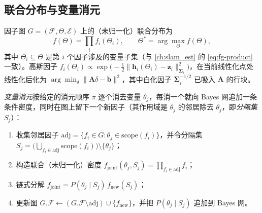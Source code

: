\subsection{联合分布与变量消元}
\label{sec:isam-elimination}

因子图 $G=(\mathcal{F},\Theta,\mathcal{E})$ 上的（未归一化）联合分布为\cite{kaess2012isam2}
\begin{equation}
  f(\Theta)=\prod_i f_i(\Theta_i),\qquad \Theta^\ast=\arg\max_\Theta f(\Theta),
  \label{eq:isam-joint}
\end{equation}
其中 $\Theta_i\subseteq\Theta$ 是第 $i$ 个因子涉及的变量子集（与 \cref{ch:slam_est} 的 \cref{eq:fg-product} 一致）。高斯因子 $f_i(\Theta_i)\propto\exp\!\big(-\tfrac12\|\mathbf{h}_i(\Theta_i)-\mathbf{z}_i\|^2_{\boldsymbol{\Sigma}_i}\big)$，在当前线性化点处线性化后化为 $\arg\min_\delta\|\mathbf{A}\delta-\mathbf{b}\|^2$，其中白化因子 $\boldsymbol{\Sigma}_i^{-1/2}$ 已吸入 $\mathbf{A}$ 的行块。

\emph{变量消元}按给定的消元顺序 $\pi$ 逐个消去变量 $\theta_j$，每消一个就向 Bayes 网追加一条条件密度，同时在图上留下一个新因子（其作用域是 $\theta_j$ 的邻居除去 $\theta_j$，即\emph{分隔集} $S_j$）：

\begin{algo}
\label{algo:eliminate}
\begin{enumerate}
  \item 收集邻居因子 $\mathrm{adj}=\{f_i\in G:\theta_j\in\mathrm{scope}(f_i)\}$，并令分隔集 $S_j=\big(\bigcup_{f_i\in\mathrm{adj}}\mathrm{scope}(f_i)\big)\setminus\{\theta_j\}$；
  \item 构造联合（未归一化）密度 $f_{\text{joint}}(\theta_j,S_j)=\prod_{f_i\in\mathrm{adj}}f_i$；
  \item 链式分解 $f_{\text{joint}}=P(\theta_j\mid S_j)\,f_{\text{new}}(S_j)$；
  \item 更新图 $G.\mathcal{F}\leftarrow(G.\mathcal{F}\setminus\mathrm{adj})\cup\{f_{\text{new}}\}$，并把 $P(\theta_j\mid S_j)$ 追加到 Bayes 网。
\end{enumerate}
\end{algo}


